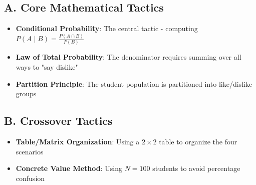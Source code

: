 \documentclass[]{article}
\begin{document}
\begin{tacticalbox}
\subsection*{A. Core Mathematical Tactics}
\begin{itemize}[leftmargin=*]
    \item \textbf{Conditional Probability}: The central tactic - computing $P(A \mid B) = \frac{P(A \cap B)}{P(B)}$
    
    \item \textbf{Law of Total Probability}: The denominator requires summing over all ways to "say dislike"
    
    \item \textbf{Partition Principle}: The student population is partitioned into like/dislike groups
\end{itemize}

\subsection*{B. Crossover Tactics}
\begin{itemize}[leftmargin=*]
    \item \textbf{Table/Matrix Organization}: Using a $2 \times 2$ table to organize the four scenarios
    
    \item \textbf{Concrete Value Method}: Using $N = 100$ students to avoid percentage confusion
\end{itemize}
\end{tacticalbox}
\end{document}
